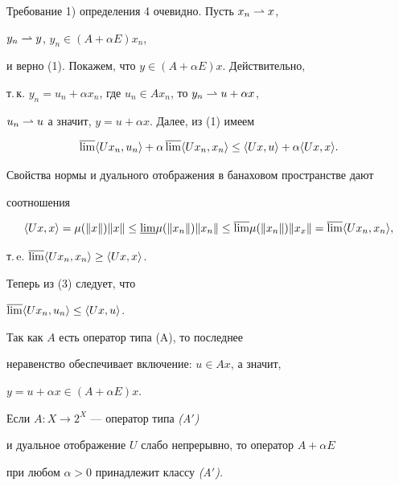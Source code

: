  


\begin{pf} Требование 1) определения 4 очевидно. Пусть $x_n\rightharpoonup x$, 


$y_n\rightharpoonup y$, $y_n\in(A+\alpha E)x_n$,


и верно (1). Покажем, что $y\in (A+\alpha E)x$. Действительно, 


т.\,к. $y_n=u_n+\alpha x_n$, где $u_n\in Ax_n$, то $y_n\rightharpoonup u+\alpha x$, 


$u_n\rightharpoonup u$ а значит, $y=u+\alpha x$. Далее, из (1) имеем 


\begin{equation} 


\overline{\lim}\la Ux_n,u_n\ra +\alpha\,\overline{\lim} 


\la Ux_n,x_n\ra \le \la Ux,u\ra +\alpha\la Ux,x\ra . 


\end{equation} 


Свойства нормы и дуального отображения в банаховом пространстве дают 


соотношения 


$$ 


\la Ux,x\ra =\mu(\|x\|)\|x\|\le\underline{\lim} 


\mu(\|x_n\|)\|x_n\|\le 


\overline{\lim}\mu(\|x_n\|)\|x_x\|=


\overline{\lim}\la Ux_n,x_n\ra, 


$$ 


т.\,e. $\overline{\lim}\langle Ux_n,x_n\rangle\ge\langle Ux,x\rangle$. 


Теперь из (3) следует, что 


$\overline{\lim}\langle Ux_n,u_n\rangle\le\langle Ux,u\rangle$. 


Так как $A$ есть оператор типа (A), то последнее 


неравенство обеспечивает включение: $u\in Ax$, а значит, 


$y=u+\alpha x\in(A+\alpha E)x$. 


\end{pf} 


 


\begin{lem} Если $A:X\to 2^X$ --- оператор типа {\em (A$'$)} 


и дуальное отображение $U$ слабо непрерывно, то оператор $A+\alpha E$ 


при любом $\alpha>0$ принадлежит классу {\em (A$'$).} 


\end{lem} 



